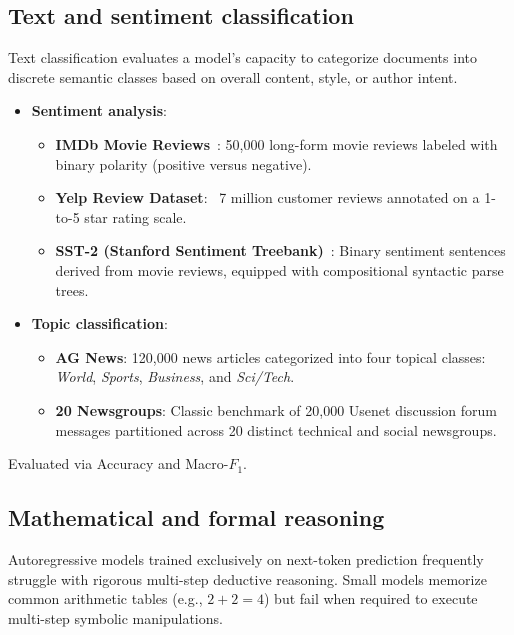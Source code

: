 \documentclass[../../main.tex]{subfiles}
\begin{document}
\subsection{Text and sentiment classification}
\label{subsec:text_classification}

Text classification evaluates a model's capacity to categorize documents into discrete semantic classes based on overall content, style, or author intent.
\begin{itemize}
    \item \textbf{Sentiment analysis}:
    \begin{itemize}
        \item \textbf{IMDb Movie Reviews}~\cite{maas2011imdb}: 50,000 long-form movie reviews labeled with binary polarity (positive versus negative).
        \item \textbf{Yelp Review Dataset}: ~7 million customer reviews annotated on a 1-to-5 star rating scale.
        \item \textbf{SST-2 (Stanford Sentiment Treebank)}~\cite{socher2013sst}: Binary sentiment sentences derived from movie reviews, equipped with compositional syntactic parse trees.
    \end{itemize}
    \item \textbf{Topic classification}:
    \begin{itemize}
        \item \textbf{AG News}: 120,000 news articles categorized into four topical classes: \textit{World}, \textit{Sports}, \textit{Business}, and \textit{Sci/Tech}.
        \item \textbf{20 Newsgroups}: Classic benchmark of 20,000 Usenet discussion forum messages partitioned across 20 distinct technical and social newsgroups.
    \end{itemize}
\end{itemize}
Evaluated via Accuracy and Macro-$F_1$.

\subsection{Mathematical and formal reasoning}
\label{subsec:mathematical_reasoning}

Autoregressive models trained exclusively on next-token prediction frequently struggle with rigorous multi-step deductive reasoning. Small models memorize common arithmetic tables (e.g., $2 + 2 = 4$) but fail when required to execute multi-step symbolic manipulations.
\end{document}
